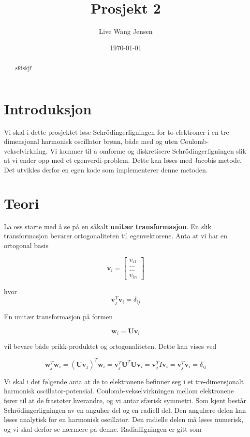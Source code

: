 \documentclass{article}
\title{Prosjekt 2}
\author{Live Wang Jensen}
\date{\today}
\begin{document}
\maketitle

\begin{abstract}
sfdskjf

\end{abstract}

\section{Introduksjon}
Vi skal i dette prosjektet løse Schrödingerligningen for to elektroner i en tre-dimensjonal harmonisk oscillator brønn, både med og uten Coulomb-vekselvirkning. Vi kommer til å omforme og diskretisere Schrödingerligningen slik at vi ender opp med et egenverdi-problem. Dette kan løses med Jacobis metode. Det utvikles derfor en egen kode som implementerer denne metoden.

\section{Teori}
La oss starte med å se på en såkalt \textbf{unitær transformasjon}. En slik transformasjon bevarer ortogonaliteten til egenvektorene. Anta at vi har en ortogonal basis

\[ \textbf{v}_i = \begin{bmatrix} v_{i1} \\
												\dots \\
												\dots \\
												v_{in}
												\end{bmatrix}   \]
												
hvor 
\[ \textbf{v}_j^T \textbf{v}_i = \delta_{ij} \]

En unitær transformasjon på formen

\[\textbf{w}_i = \textbf{Uv}_i \]

vil bevare både prikk-produktet og ortogonaliteten. Dette kan vises ved

\[ \textbf{w}_j^T \textbf{w}_i = (\textbf{Uv}_j)^T \textbf{w}_i = \textbf{v}_j^T \textbf{U}^T \textbf{Uv}_i = \textbf{v}_j^T I \textbf{v}_i = \textbf{v}_j^T \textbf{v}_i = \delta_{ij} \]



Vi skal i det følgende anta at de to elektronene befinner seg i et tre-dimensjonalt harmonisk oscillator-potensial. Coulomb-vekselvirkningen mellom elektronene fører til at de frastøter hverandre, og vi antar sfærisk symmetri. Som kjent består Schrödingerligningen av en angulær del og en radiell del. Den angulære delen kan løses analytisk for en harmonisk oscillator. Den radielle delen må løses numerisk, og vi skal derfor se nærmere på denne. Radialligningen er gitt som 
\end{document}
